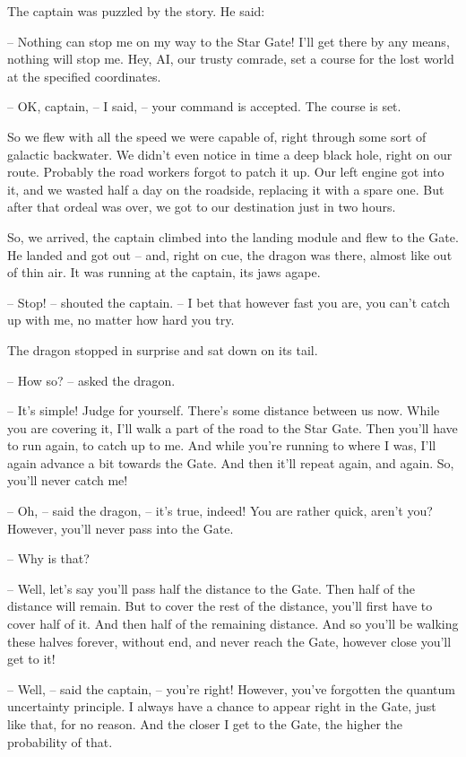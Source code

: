 \documentclass[ebook,oneside,final,openright]{memoir}
\begin{document}
\par
The captain was puzzled by the story. He said:\par
– Nothing can stop me on my way to the Star Gate! I’ll get there by any means, nothing will stop me. Hey, AI, our trusty comrade, set a course for the lost world at the specified coordinates.\par
– OK, captain, – I said, – your command is accepted. The course is set.\par
So we flew with all the speed we were capable of, right through some sort of galactic backwater. We didn’t even notice in time a deep black hole, right on our route. Probably the road workers forgot to patch it up. Our left engine got into it, and we wasted half a day on the roadside, replacing it with a spare one. But after that ordeal was over, we got to our destination just in two hours.\par
\par
So, we arrived, the captain climbed into the landing module and flew to the Gate. He landed and got out – and, right on cue, the dragon was there, almost like out of thin air. It was running at the captain, its jaws agape.\par
– Stop! – shouted the captain. – I bet that however fast you are, you can’t catch up with me, no matter how hard you try.\par
The dragon stopped in surprise and sat down on its tail.\par
– How so? – asked the dragon.\par
– It’s simple! Judge for yourself. There’s some distance between us now. While you are covering it, I’ll walk a part of the road to the Star Gate. Then you’ll have to run again, to catch up to me. And while you’re running to where I was, I’ll again advance a bit towards the Gate. And then it’ll repeat again, and again. So, you’ll never catch me!\par
– Oh, – said the dragon, – it’s true, indeed! You are rather quick, aren’t you? However, you’ll never pass into the Gate.\par
– Why is that?\par
– Well, let’s say you’ll pass half the distance to the Gate. Then half of the distance will remain. But to cover the rest of the distance, you’ll first have to cover half of it. And then half of the remaining distance. And so you’ll be walking these halves forever, without end, and never reach the Gate, however close you’ll get to it!\par
– Well, – said the captain, – you’re right! However, you’ve forgotten the quantum uncertainty principle. I always have a chance to appear right in the Gate, just like that, for no reason. And the closer I get to the Gate, the higher the probability of that.\par
\end{document}
